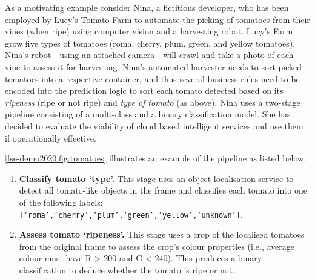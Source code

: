As a motivating example consider Nina, a fictitious developer, who has been employed by Lucy's Tomato Farm to automate the picking of tomatoes from their vines (when ripe) using computer vision and a harvesting robot. Lucy's Farm grow five types of tomatoes (roma, cherry, plum, green, and yellow tomatoes). Nina's robot---using an attached camera---will crawl and take a photo of each vine to assess it for harvesting.
Nina's automated harvester needs to sort picked tomatoes into a respective container, and thus several business rules need to be encoded into the prediction logic to sort each tomato detected based on its \textit{ripeness} (ripe or not ripe) and \textit{type of tomato} (as above).
Nina uses a two-stage pipeline consisting of a multi-class and a binary classification model. She has decided to evaluate the viability of cloud based intelligent services and use them if operationally effective.

\cref{fse-demo2020:fig:tomatoes} illustrates an example of the pipeline as listed below:

\begin{enumerate}
    \item \textbf{Classify tomato `type'.} This stage uses an object localisation service to detect all tomato-like objects in the frame and classifies each tomato into one of the following labels: \texttt{[`roma',`cherry',`plum',`green',`yellow',`unknown']}.
    \item \textbf{Assess tomato `ripeness'.} This stage uses a crop of the localised tomatoes from the original frame to assess the crop's colour properties (i.e., average colour must have R > 200 and G < 240). This produces a binary classification to deduce whether the tomato is ripe or not.
\end{enumerate}

